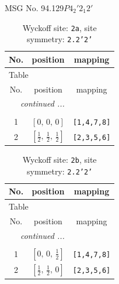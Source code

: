 \documentclass[fleqn,8pt]{jsarticle}
\begin{document}
\setcounter{MaxMatrixCols}{32}

\renewcommand{\tablename}{Table~}
\renewcommand{\figurename}{Figure~}
\begin{center}
\LARGE
MSG No. 94.129\quad$P4_{2}'2_{1}2'$
\end{center}
\renewcommand{\arraystretch}{1.2}
\begin{longtable}{ccc}
\caption{Wyckoff site: {\tt 2a}, site symmetry: {\tt 2.2'2'}}
 \\
 \hline \hline
No. & position & mapping \\ \hline \endfirsthead

\multicolumn{2}{l}{\tablename\ \thetable{}} \\
 \hline \hline
No. & position & mapping \\ \hline \endhead

 \hline \hline
\multicolumn{2}{r}{\footnotesize\it continued ...} \\ \endfoot

 \hline \hline
\multicolumn{2}{r}{} \\ \endlastfoot

1 & $\left[ 0,\, 0,\, 0 \right]$ & {\tt [1,4,7,8]} \\ \hline
2 & $\left[ \frac{1}{2},\, \frac{1}{2},\, \frac{1}{2} \right]$ & {\tt [2,3,5,6]} \\
\end{longtable}
\renewcommand{\arraystretch}{1.2}
\begin{longtable}{ccc}
\caption{Wyckoff site: {\tt 2b}, site symmetry: {\tt 2.2'2'}}
 \\
 \hline \hline
No. & position & mapping \\ \hline \endfirsthead

\multicolumn{2}{l}{\tablename\ \thetable{}} \\
 \hline \hline
No. & position & mapping \\ \hline \endhead

 \hline \hline
\multicolumn{2}{r}{\footnotesize\it continued ...} \\ \endfoot

 \hline \hline
\multicolumn{2}{r}{} \\ \endlastfoot

1 & $\left[ 0,\, 0,\, \frac{1}{2} \right]$ & {\tt [1,4,7,8]} \\ \hline
2 & $\left[ \frac{1}{2},\, \frac{1}{2},\, 0 \right]$ & {\tt [2,3,5,6]} \\
\end{longtable}
\end{document}
